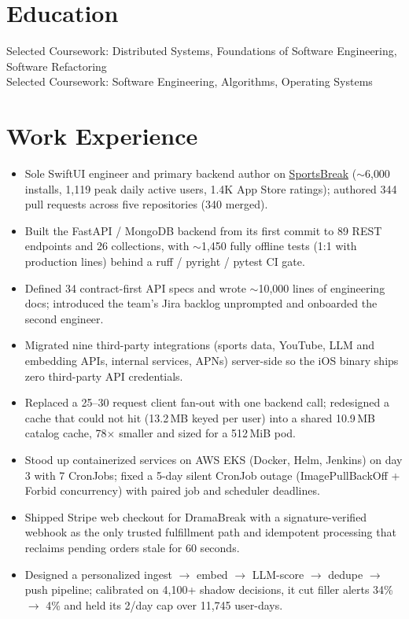 \documentclass[11pt, letterpaper]{article}
\begin{document}

\section{Education}
Selected Coursework: Distributed Systems, Foundations of Software Engineering, Software Refactoring\\[1pt]
Selected Coursework: Software Engineering, Algorithms, Operating Systems

\section{Work Experience}
\begin{itemize}
  \item Sole SwiftUI engineer and primary backend author on \href{https://apps.apple.com/app/id6762649287}{SportsBreak} ($\sim$6{,}000 installs, 1{,}119 peak daily active users, 1.4K App Store ratings); authored 344 pull requests across five repositories (340 merged).
  \item Built the FastAPI / MongoDB backend from its first commit to 89 REST endpoints and 26 collections, with $\sim$1{,}450 fully offline tests (1:1 with production lines) behind a ruff / pyright / pytest CI gate.
  \item Defined 34 contract-first API specs and wrote $\sim$10{,}000 lines of engineering docs; introduced the team's Jira backlog unprompted and onboarded the second engineer.
  \item Migrated nine third-party integrations (sports data, YouTube, LLM and embedding APIs, internal services, APNs) server-side so the iOS binary ships zero third-party API credentials.
  \item Replaced a 25--30 request client fan-out with one backend call; redesigned a cache that could not hit (13.2\,MB keyed per user) into a shared 10.9\,MB catalog cache, 78$\times$ smaller and sized for a 512\,MiB pod.
  \item Stood up containerized services on AWS EKS (Docker, Helm, Jenkins) on day 3 with 7 CronJobs; fixed a 5-day silent CronJob outage (ImagePullBackOff + Forbid concurrency) with paired job and scheduler deadlines.
  \item Shipped Stripe web checkout for DramaBreak with a signature-verified webhook as the only trusted fulfillment path and idempotent processing that reclaims pending orders stale for 60 seconds.
  \item Designed a personalized ingest $\to$ embed $\to$ LLM-score $\to$ dedupe $\to$ push pipeline; calibrated on 4{,}100+ shadow decisions, it cut filler alerts 34\% $\to$ 4\% and held its 2/day cap over 11{,}745 user-days.
\end{itemize}
\end{document}
